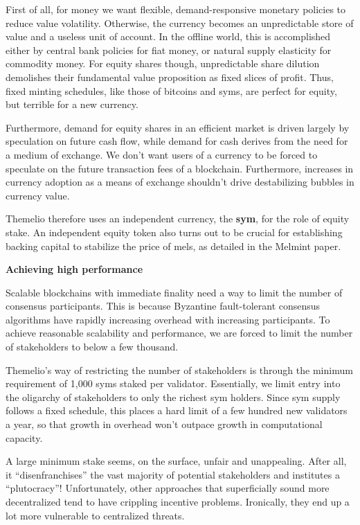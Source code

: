 \documentclass[]{article}
\begin{document}
First of all, for money we want flexible, demand-responsive monetary
policies to reduce value volatility. Otherwise, the currency becomes an
unpredictable store of value and a useless unit of account. In the
offline world, this is accomplished either by central bank policies for
fiat money, or natural supply elasticity for commodity money. For equity
shares though, unpredictable share dilution demolishes their fundamental
value proposition as fixed slices of profit. Thus, fixed minting
schedules, like those of bitcoins and syms, are perfect for equity, but
terrible for a new currency.

Furthermore, demand for equity shares in an efficient market is driven
largely by speculation on future cash flow, while demand for cash
derives from the need for a medium of exchange. We don't want users of a
currency to be forced to speculate on the future transaction fees of a
blockchain. Furthermore, increases in currency adoption as a means of
exchange shouldn't drive destabilizing bubbles in currency value.

Themelio therefore uses an independent currency, the \textbf{sym}, for
the role of equity stake. An independent equity token also turns out to
be crucial for establishing backing capital to stabilize the price of
mels, as detailed in the Melmint paper.

\textbf{Achieving high performance}

Scalable blockchains with immediate finality need a way to limit the
number of consensus participants. This is because Byzantine
fault-tolerant consensus algorithms have rapidly increasing overhead
with increasing participants. To achieve reasonable scalability and
performance, we are forced to limit the number of stakeholders to below
a few thousand.

Themelio's way of restricting the number of stakeholders is through the
minimum requirement of 1,000 syms staked per validator. Essentially, we
limit entry into the oligarchy of stakeholders to only the richest sym
holders. Since sym supply follows a fixed schedule, this places a hard
limit of a few hundred new validators a year, so that growth in overhead
won't outpace growth in computational capacity.

A large minimum stake seems, on the surface, unfair and unappealing.
After all, it ``disenfranchises'' the vast majority of potential
stakeholders and institutes a ``plutocracy''! Unfortunately, other
approaches that superficially sound more decentralized tend to have
crippling incentive problems. Ironically, they end up a lot more
vulnerable to centralized threats.
\end{document}
